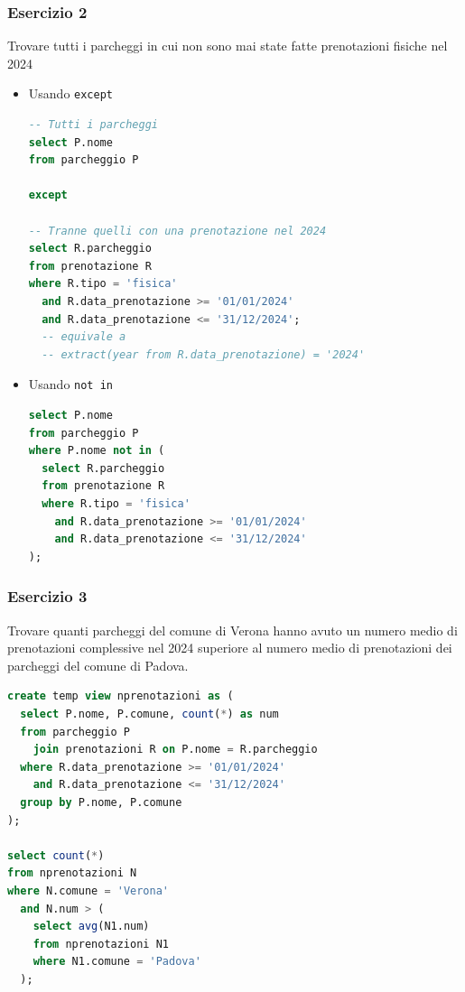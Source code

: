 \documentclass[a4paper]{article}
\begin{document}
\subsubsection{Esercizio 2}
Trovare tutti i parcheggi in cui non sono mai state fatte prenotazioni 
fisiche nel 2024
\begin{itemize}
  \item Usando \texttt{except}
\begin{lstlisting}[language=SQL]
-- Tutti i parcheggi
select P.nome
from parcheggio P

except

-- Tranne quelli con una prenotazione nel 2024
select R.parcheggio
from prenotazione R
where R.tipo = 'fisica'
  and R.data_prenotazione >= '01/01/2024'
  and R.data_prenotazione <= '31/12/2024';
  -- equivale a
  -- extract(year from R.data_prenotazione) = '2024'
\end{lstlisting}

  \item Usando \texttt{not in}
\begin{lstlisting}[language=SQL]
select P.nome
from parcheggio P
where P.nome not in (
  select R.parcheggio
  from prenotazione R
  where R.tipo = 'fisica'
    and R.data_prenotazione >= '01/01/2024'
    and R.data_prenotazione <= '31/12/2024'
);
\end{lstlisting}
\end{itemize}


\subsubsection{Esercizio 3}
Trovare quanti parcheggi del comune di Verona hanno avuto un numero medio di
prenotazioni complessive nel 2024 superiore al numero medio di prenotazioni dei
parcheggi del comune di Padova.

\begin{lstlisting}[language=SQL]
create temp view nprenotazioni as (
  select P.nome, P.comune, count(*) as num
  from parcheggio P
    join prenotazioni R on P.nome = R.parcheggio
  where R.data_prenotazione >= '01/01/2024'
    and R.data_prenotazione <= '31/12/2024'
  group by P.nome, P.comune
);

select count(*)
from nprenotazioni N
where N.comune = 'Verona'
  and N.num > (
    select avg(N1.num)
    from nprenotazioni N1
    where N1.comune = 'Padova'
  );
\end{lstlisting}
\end{document}
